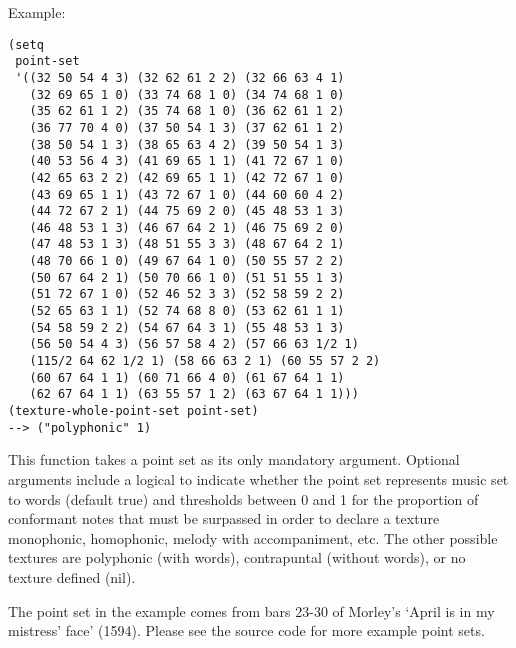 \vspace{0.5cm}
\noindent Example:
\begin{verbatim}
(setq
 point-set
 '((32 50 54 4 3) (32 62 61 2 2) (32 66 63 4 1)
   (32 69 65 1 0) (33 74 68 1 0) (34 74 68 1 0)
   (35 62 61 1 2) (35 74 68 1 0) (36 62 61 1 2)
   (36 77 70 4 0) (37 50 54 1 3) (37 62 61 1 2)
   (38 50 54 1 3) (38 65 63 4 2) (39 50 54 1 3)
   (40 53 56 4 3) (41 69 65 1 1) (41 72 67 1 0)
   (42 65 63 2 2) (42 69 65 1 1) (42 72 67 1 0)
   (43 69 65 1 1) (43 72 67 1 0) (44 60 60 4 2)
   (44 72 67 2 1) (44 75 69 2 0) (45 48 53 1 3)
   (46 48 53 1 3) (46 67 64 2 1) (46 75 69 2 0)
   (47 48 53 1 3) (48 51 55 3 3) (48 67 64 2 1)
   (48 70 66 1 0) (49 67 64 1 0) (50 55 57 2 2)
   (50 67 64 2 1) (50 70 66 1 0) (51 51 55 1 3)
   (51 72 67 1 0) (52 46 52 3 3) (52 58 59 2 2)
   (52 65 63 1 1) (52 74 68 8 0) (53 62 61 1 1)
   (54 58 59 2 2) (54 67 64 3 1) (55 48 53 1 3)
   (56 50 54 4 3) (56 57 58 4 2) (57 66 63 1/2 1)
   (115/2 64 62 1/2 1) (58 66 63 2 1) (60 55 57 2 2)
   (60 67 64 1 1) (60 71 66 4 0) (61 67 64 1 1)
   (62 67 64 1 1) (63 55 57 1 2) (63 67 64 1 1)))
(texture-whole-point-set point-set)
--> ("polyphonic" 1)
\end{verbatim}

\noindent This function takes a point set as its only
mandatory argument. Optional arguments include a
logical to indicate whether the point set represents
music set to words (default true) and thresholds
between 0 and 1 for the proportion of conformant notes
that must be surpassed in order to declare a texture
monophonic, homophonic, melody with accompaniment,
etc. The other possible textures are polyphonic (with
words), contrapuntal (without words), or no texture
defined (nil).

The point set in the example comes from bars 23-30 of
Morley's `April is in my mistress' face' (1594).
Please see the source code for more example point
sets.


